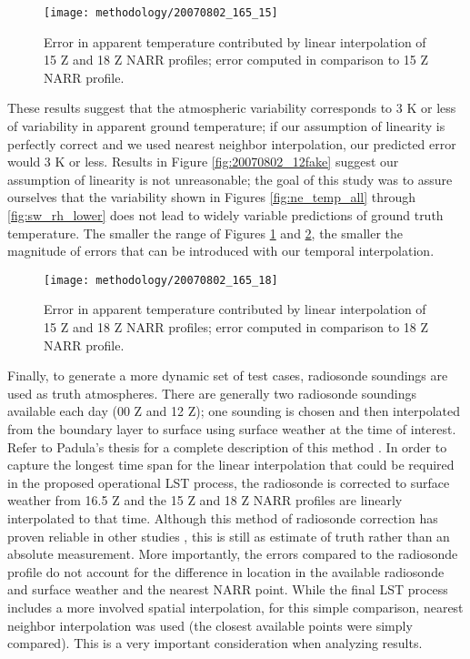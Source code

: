 \documentclass{book}
\begin{document}
\begin{figure}[H]
\centering
\texttt{[image: methodology/20070802\_165\_15]}
\caption{Error in apparent temperature contributed by linear interpolation of 15 Z and 18 Z NARR profiles; error computed in comparison to 15 Z NARR profile.}
\label{fig:20070802_165_15}
\end{figure}

These results suggest that the atmospheric variability corresponds to 3 K or less of variability in apparent ground temperature; if our assumption of linearity is perfectly correct and we used nearest neighbor interpolation, our predicted error would 3 K or less.  Results in Figure \ref{fig:20070802_12fake} suggest our assumption of linearity is not unreasonable; the goal of this study was to assure ourselves that the variability shown in Figures \ref{fig:ne_temp_all} through \ref{fig:sw_rh_lower} does not lead to  widely variable predictions of ground truth temperature.  The smaller the range of Figures \ref{fig:20070802_165_15} and \ref{fig:20070802_165_18}, the smaller the magnitude of errors that can be introduced with our temporal interpolation.

\begin{figure}[H]
\centering
\texttt{[image: methodology/20070802\_165\_18]}
\caption{Error in apparent temperature contributed by linear interpolation of 15 Z and 18 Z NARR profiles; error computed in comparison to 18 Z NARR profile.}
\label{fig:20070802_165_18}
\end{figure}

Finally, to generate a more dynamic set of test cases, radiosonde soundings are used as truth atmospheres.  There are generally two radiosonde soundings available each day (00 Z and 12 Z); one sounding is chosen and then interpolated from the boundary layer to surface using surface weather at the time of interest.  Refer to Padula's thesis for a complete description of this method \cite{padula_2008}.  In order to capture the longest time span for the linear interpolation that could be required in the proposed operational LST process, the radiosonde is corrected to surface weather from 16.5 Z and the 15 Z and 18 Z NARR profiles are linearly interpolated to that time.  Although this method of radiosonde correction has proven reliable in other studies \cite{padula_2008}, this is still as estimate of truth rather than an absolute measurement.  More importantly, the errors compared to the radiosonde profile do not account for the difference in location in the available radiosonde and surface weather and the nearest NARR point.  While the final LST process includes a more involved spatial interpolation, for this simple comparison, nearest neighbor interpolation was used (the closest available points were simply compared).  This is a very important consideration when analyzing results.
\end{document}
